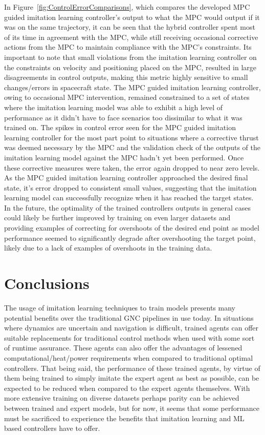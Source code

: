 \documentclass[twocolumn,letterpaper]{IEEEAerospaceCLS}
\begin{document}
In Figure~\ref{fig:ControlErrorComparisons}, which compares the developed MPC guided imitation learning controller's output to what the MPC would output if it was on the same trajectory, it can be seen that the hybrid controller spent most of its time in agreement with the MPC, while still receiving occasional corrective actions from the MPC to maintain compliance with the MPC's constraints. Its important to note that small violations from the imitation learning controller on the constraints on velocity and positioning placed on the MPC, resulted in large disagreements in control outputs, making this metric highly sensitive to small changes/errors in spacecraft state. The MPC guided imitation learning controller, owing to occasional MPC intervention, remained constrained to a set of states where the imitation learning model was able to exhibit a high level of performance as it didn't have to face scenarios too dissimilar to what it was trained on. The spikes in control error seen for the MPC guided imitation learning controller for the most part point to situations where a corrective thrust was deemed necessary by the MPC and the validation check of the outputs of the imitation learning model against the MPC hadn't yet been performed. Once these corrective measures were taken, the error again dropped to near zero levels. As the MPC guided imitation learning controller approached the desired final state, it's error dropped to consistent small values, suggesting that the imitation learning model can successfully recognize when it has reached the target states. In the future, the optimality of the trained controllers outputs in general cases could likely be further improved by training on even larger datasets and providing examples of correcting for overshoots of the desired end point as model performance seemed to significantly degrade after overshooting the target point, likely due to a lack of examples of overshoots in the training data.

\section{Conclusions}

The usage of imitation learning techniques to train models presents many potential benefits over the traditional GNC pipelines in use today. In situations where dynamics are uncertain and navigation is difficult, trained agents can offer suitable replacements for traditional control methods when used with some sort of runtime assurance\cite{Feron2022-bd,Kalaria2023-su,Sinha2023-st}. These agents can also offer the advantages of lessened computational/heat/power requirements when compared to traditional optimal controllers. That being said, the performance of these trained agents, by virtue of them being trained to simply imitate the expert agent as best as possible, can be expected to be reduced when compared to the expert agents themselves. With more extensive training on diverse datasets perhaps parity can be achieved between trained and expert models, but for now, it seems that some performance must be sacrificed to experience the benefits that imitation learning and ML based controllers have to offer.
\end{document}
